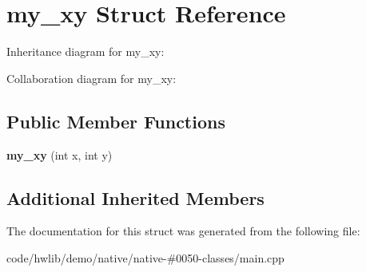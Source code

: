 \hypertarget{structmy__xy}{}\section{my\+\_\+xy Struct Reference}
\label{structmy__xy}


Inheritance diagram for my\+\_\+xy\+:


Collaboration diagram for my\+\_\+xy\+:
\subsection*{Public Member Functions}
\begin{DoxyCompactItemize}
\item 
\mbox{\label{structmy__xy_a4a720c4fd47cead4b4299d5100919b88}} 
{\bfseries my\+\_\+xy} (int x, int y)
\end{DoxyCompactItemize}
\subsection*{Additional Inherited Members}


The documentation for this struct was generated from the following file\+:\begin{DoxyCompactItemize}
\item 
code/hwlib/demo/native/native-\/\#0050-\/classes/main.\+cpp\end{DoxyCompactItemize}
